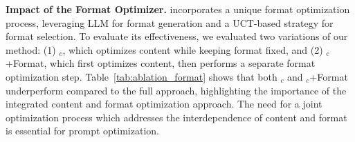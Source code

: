 \noindent \textbf{Impact of the Format Optimizer.}
\sysname{} incorporates a unique format optimization process, leveraging LLM for format generation and a UCT-based strategy for format selection.
To evaluate its effectiveness, we evaluated two variations of our method: (1) \sysname{}$_c$, which optimizes content while keeping format fixed, and (2) \sysname{}$_c$+Format, which first optimizes content, then performs a separate format optimization step.
Table~\ref{tab:ablation_format} shows that both \sysname{}$_c$ and \sysname{}$_c$+Format underperform compared to the full \sysname{} approach, highlighting the importance of the integrated content and format optimization approach. The need for a joint optimization process which addresses the interdependence of content and format is essential for prompt optimization.

